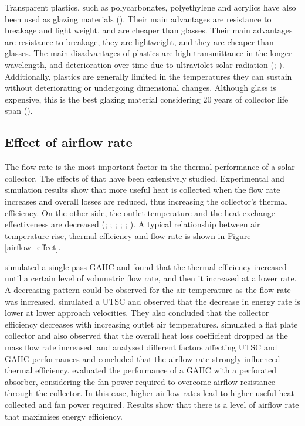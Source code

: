 Transparent plastics, such as polycarbonates, polyethylene and acrylics have also been used as glazing materials (\cite{Koyuncu2006}). Their main advantages are resistance to breakage and light weight, and are cheaper than glasses. Their main advantages are resistance to breakage, they are lightweight, and they are cheaper than glasses. The main disadvantages of plastics are high transmittance in the longer wavelength, and deterioration over time due to ultraviolet solar radiation (\cite{Goswami2015}; \cite{Duffie2013}). Additionally, plastics are generally limited in the temperatures they can sustain without deteriorating or undergoing dimensional changes. Although glass is expensive, this is the best glazing material considering 20 years of collector life span (\cite{Shams2013}).

\subsection{Effect of airflow rate}  

The flow rate is the most important factor in the thermal performance of a solar collector. The effects of that have been extensively studied. Experimental and simulation results show that more useful heat is collected when the flow rate increases and overall losses are reduced, thus increasing the collector's thermal efficiency. On the other side, the outlet temperature and the heat exchange effectiveness are decreased (\cite{Christensen1997}; \cite{Ammari2003}; \cite{Leon2007}; \cite{El-Sebaii2010}; \cite{Zomorodian2012}; \cite{Li2016}). A typical relationship between air temperature rise, thermal efficiency and flow rate is shown in Figure \ref{airflow_effect}.


\citet{Ammari2003} simulated a single-pass GAHC and found that the thermal efficiency increased until a certain level of volumetric flow rate, and then it increased at a lower rate. A decreasing pattern could be observed for the air temperature as the flow rate was increased. \citet{Leon2007} simulated a UTSC and observed that the decrease in energy rate is lower at lower approach velocities. They also concluded that the collector efficiency decreases with increasing outlet air temperatures. \citet{Jafarkazemi2013} simulated a flat plate collector and also observed that the overall heat loss coefficient dropped as the mass flow rate increased. \citet{Badache2014} and \citet{Nowzari2015} analysed different factors affecting UTSC and GAHC performances and concluded that the airflow rate strongly influenced thermal efficiency. \citet{Li2016} evaluated the performance of a GAHC with a perforated absorber, considering the fan power required to overcome airflow resistance through the collector. In this case, higher airflow rates lead to higher useful heat collected and fan power required. Results show that there is a level of airflow rate that maximises energy efficiency.

